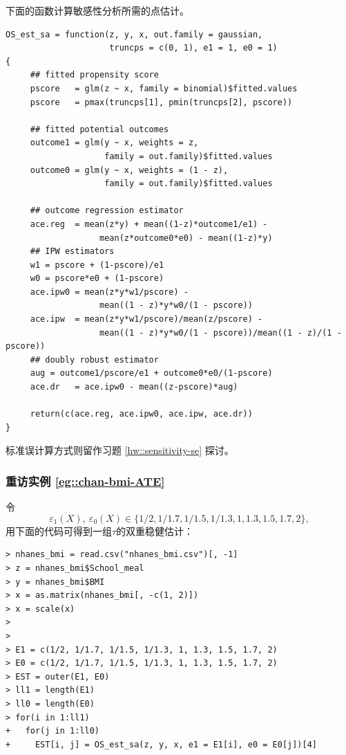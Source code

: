 下面的函数计算敏感性分析所需的点估计。 

\begin{lstlisting}
OS_est_sa = function(z, y, x, out.family = gaussian, 
                     truncps = c(0, 1), e1 = 1, e0 = 1)
{
     ## fitted propensity score
     pscore   = glm(z ~ x, family = binomial)$fitted.values
     pscore   = pmax(truncps[1], pmin(truncps[2], pscore))
     
     ## fitted potential outcomes
     outcome1 = glm(y ~ x, weights = z, 
                    family = out.family)$fitted.values
     outcome0 = glm(y ~ x, weights = (1 - z), 
                    family = out.family)$fitted.values
     
     ## outcome regression estimator
     ace.reg  = mean(z*y) + mean((1-z)*outcome1/e1) - 
                   mean(z*outcome0*e0) - mean((1-z)*y) 
     ## IPW estimators
     w1 = pscore + (1-pscore)/e1
     w0 = pscore*e0 + (1-pscore)
     ace.ipw0 = mean(z*y*w1/pscore) - 
                   mean((1 - z)*y*w0/(1 - pscore))
     ace.ipw  = mean(z*y*w1/pscore)/mean(z/pscore) - 
                   mean((1 - z)*y*w0/(1 - pscore))/mean((1 - z)/(1 - pscore))
     ## doubly robust estimator
     aug = outcome1/pscore/e1 + outcome0*e0/(1-pscore)
     ace.dr   = ace.ipw0 - mean((z-pscore)*aug)

     return(c(ace.reg, ace.ipw0, ace.ipw, ace.dr))     
}
\end{lstlisting}

标准误计算方式则留作习题 \ref{hw::sensitivity-se} 探讨。 

\subsubsection{重访实例 \ref{eg::chan-bmi-ATE}}


令
$$
\varepsilon_1(X),\ \varepsilon_0(X) \in \{1/2, 1/1.7, 1/1.5, 1/1.3, 1, 1.3, 1.5, 1.7, 2\},
$$
用下面的代码可得到一组$\tau$的双重稳健估计：
\begin{lstlisting}
> nhanes_bmi = read.csv("nhanes_bmi.csv")[, -1]
> z = nhanes_bmi$School_meal
> y = nhanes_bmi$BMI
> x = as.matrix(nhanes_bmi[, -c(1, 2)])
> x = scale(x)
> 
> 
> E1 = c(1/2, 1/1.7, 1/1.5, 1/1.3, 1, 1.3, 1.5, 1.7, 2)
> E0 = c(1/2, 1/1.7, 1/1.5, 1/1.3, 1, 1.3, 1.5, 1.7, 2)
> EST = outer(E1, E0)
> ll1 = length(E1)
> ll0 = length(E0)
> for(i in 1:ll1)
+   for(j in 1:ll0)
+     EST[i, j] = OS_est_sa(z, y, x, e1 = E1[i], e0 = E0[j])[4]
\end{lstlisting}




